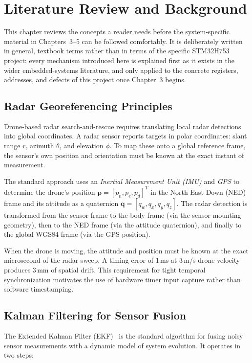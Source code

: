 \chapter{Literature Review and Background}
\label{ch:background}

This chapter reviews the concepts a reader needs before the system-specific material in Chapters~3--5 can be followed comfortably. It is deliberately written in general, textbook terms rather than in terms of the specific STM32H753 project: every mechanism introduced here is explained first as it exists in the wider embedded-systems literature, and only applied to the concrete registers, addresses, and defects of this project once Chapter~3 begins.

\section{Radar Georeferencing Principles}

Drone-based radar search-and-rescue requires translating local radar detections into global coordinates. A radar sensor reports targets in polar coordinates: slant range $r$, azimuth $\theta$, and elevation $\phi$. To map these onto a global reference frame, the sensor's own position and orientation must be known at the exact instant of measurement.

The standard approach uses an \emph{Inertial Measurement Unit (IMU)} and \emph{GPS} to determine the drone's position $\mathbf{p} = [p_n, p_e, p_d]^T$ in the North-East-Down (NED) frame and its attitude as a quaternion $\mathbf{q} = [q_w, q_x, q_y, q_z]$. The radar detection is transformed from the sensor frame to the body frame (via the sensor mounting geometry), then to the NED frame (via the attitude quaternion), and finally to the global WGS84 frame (via the GPS position).

When the drone is moving, the attitude and position must be known at the exact microsecond of the radar sweep. A timing error of 1\,ms at 3\,m/s drone velocity produces 3\,mm of spatial drift. This requirement for tight temporal synchronization motivates the use of hardware timer input capture rather than software timestamping.

\section{Kalman Filtering for Sensor Fusion}

The Extended Kalman Filter (EKF)~\cite{thrun2005,grewal2008} is the standard algorithm for fusing noisy sensor measurements with a dynamic model of system evolution. It operates in two steps:

